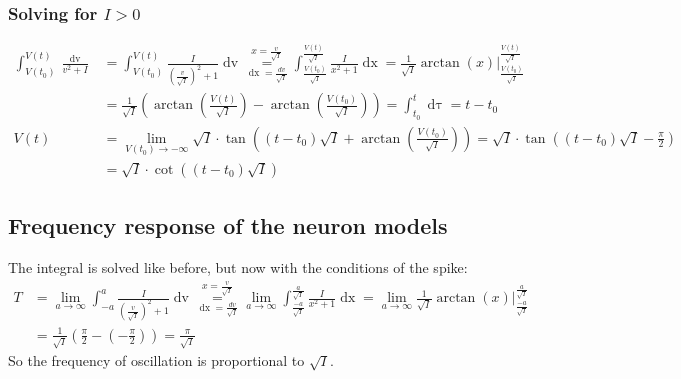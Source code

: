 \subsubsection{Solving for \texorpdfstring{$I > 0$}{TEXT}}
\begin{align*}
\int_{V(t_0)}^{V(t)} \frac{\mathop{dv}}{v^2 + I} &= \int_{V(t_0)}^{V(t)} \frac{I}{\left(\frac{v}{\sqrt{I}}\right)^2 + 1} \mathop{dv} 
\overset{x = \frac{v}{\sqrt{I}}}{\underset{\mathop{dx} = \frac{dv}{\sqrt{I}}}{=}} 
\int_{\frac{V(t_0)}{\sqrt{I}}}^{\frac{V(t)}{\sqrt{I}}} \frac{I}{x^2 + 1} \mathop{dx}= \frac{1}{\sqrt{I}} \arctan(x) \Big \rvert_{\frac{V(t_0)}{\sqrt{I}}}^{\frac{V(t)}{\sqrt{I}}} \\
&= \frac{1}{\sqrt{I}} \left( \arctan \left( \frac{V(t)}{\sqrt{I}} \right) - \arctan \left( \frac{V(t_0)}{\sqrt{I}} \right) \right) = 
\int_{t_0}^t \mathop{d\tau} = t - t_0 \\
V(t) &= \lim_{V(t_0) \rightarrow -\infty} \sqrt{I} \cdot \tan \left( (t - t_0) \sqrt{I} + \arctan \left( \frac{V(t_0)}{\sqrt{I}} \right) \right) = \sqrt{I} \cdot \tan \left( (t - t_0) \sqrt{I} - \frac{\pi}{2} \right) \\
&=  \sqrt{I} \cdot \cot \left( (t - t_0) \sqrt{I} \right) 
\end{align*}


\subsection{Frequency response of the neuron models} \label{app:ThetaModelFrequencyResponse}
The integral is solved like before, but now with the conditions of the spike:
\begin{align*}
T &= \lim_{a \rightarrow \infty} \int_{-a}^{a} \frac{I}{\left(\frac{v}{\sqrt{I}}\right)^2 + 1} \mathop{dv} 
\overset{x = \frac{v}{\sqrt{I}}}{\underset{\mathop{dx} = \frac{dv}{\sqrt{I}}}{=}} 
\lim_{a \rightarrow \infty} \int_{\frac{-a}{\sqrt{I}}}^{\frac{a}{\sqrt{I}}} \frac{I}{x^2 + 1} \mathop{dx}
= \lim_{a \rightarrow \infty} \frac{1}{\sqrt{I}} \arctan(x) \Big \rvert_{\frac{-a}{\sqrt{I}}}^{\frac{a}{\sqrt{I}}} \\
&= \frac{1}{\sqrt{I}} \left( \frac{\pi}{2} - \left( - \frac{\pi}{2} \right) \right)
= \frac{\pi}{\sqrt{I}}
\end{align*}
So the frequency of oscillation is proportional to $\sqrt{I}$. 


